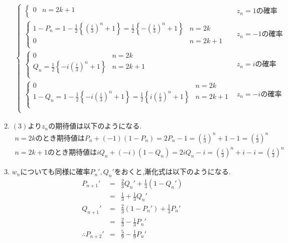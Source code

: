\documentclass[dvipdfmx,titlepage, 11pt, a4paper]{jsarticle}%
\begin{document}
\begin{enumerate}[(1)]
\begin{eqnarray}
\begin{cases}
\begin{cases}
				  0 & n = 2k + 1\\
				\end{cases} & z_n = 1の確率\\
				\begin{cases}
				  1 - P_n = 1 - \frac{1}{2}\left\{\left(\frac{i}{3}\right)^{n} + 1\right\} 
				  = \frac{1}{2}\left\{-\left(\frac{i}{3}\right)^{n} + 1\right\} & n = 2k\\
				  0 & n = 2k + 1\\
				\end{cases} & z_n = -1の確率\\
				\begin{cases}
				  0 & n = 2k\\
				  Q_n = \frac{1}{2}\left\{-i\left(\frac{i}{3}\right)^{n} + 1\right\} & n = 2k + 1\\
				\end{cases} & z_n = iの確率\\
				\begin{cases}
				  0 & n = 2k\\
				  1 - Q_n = 1 - \frac{1}{2}\left\{-i\left(\frac{i}{3}\right)^{n} + 1\right\}
				  = \frac{1}{2}\left\{i\left(\frac{i}{3}\right)^{n} + 1\right\} & n = 2k + 1\\
				\end{cases} & z_n = -iの確率\\
			  \end{cases}　
		  \end{eqnarray}
	\item $(3)$より$z_n$の期待値は以下のようになる.
	\begin{eqnarray*}
		n = 2kのとき期待値はP_n + (-1)(1 - P_n) = 2P_n - 1 = \left(\frac{i}{3}\right)^{n} + 1 - 1 = \left(\frac{i}{3}\right)^{n}\\
		n = 2k + 1のとき期待値は iQ_n + (-i)(1 - Q_n) = 2iQ_n - i = \left(\frac{i}{3}\right)^{n} + i - i = \left(\frac{i}{3}\right)^{n}
	\end{eqnarray*}
	\item $w_n$についても同様に確率$P_n', Q_n'$をおくと,漸化式は以下のようになる.
	\begin{eqnarray*}
		P_{n + 1}' &=& \frac{2}{3}Q_{n}' + \frac{1}{3}(1 - Q_{n}')\\
		 &=& \frac{1}{3} + \frac{1}{3}Q_{n}'\\
		Q_{n + 1}' &=& \frac{2}{3}(1 - P_{n}') + \frac{1}{3}P_{n}'\\
		 &=& \frac{2}{3} - \frac{1}{3}P_{n}'\\
		\therefore P_{n + 2}' &=& \frac{5}{9} - \frac{1}{9}P_{n}'\\

\end{eqnarray*}
\end{enumerate}
\end{document}
